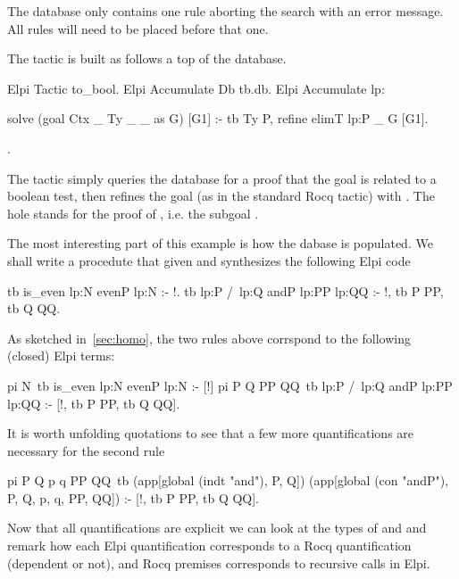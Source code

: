 \documentclass[a4paper, 11pt]{book}
\begin{document}
The database only contains one rule aborting the search with an error message.
All rules will need to be placed before that one.

The  tactic is built as follows a top of the
database.

\begin{rocqcode}
Elpi Tactic to_bool.
Elpi Accumulate Db tb.db.
Elpi Accumulate lp:{{

solve (goal Ctx _ Ty _ _ as G) [G1] :-
  tb Ty P,
  refine {{ elimT lp:P _ }} G [G1].

}}.
\end{rocqcode}

The tactic simply queries the database for a proof  that
the goal is related to a boolean test, then refines the goal (as in the
standard Rocq  tactic) with .
The hole stands for the proof of , i.e. the subgoal
.

The most interesting part of this example is how the dabase is populated.
We shall write a  procedute that given 
and  synthesizes the following Elpi code

\begin{elpicode}
tb {{ is_even lp:N }} {{ evenP lp:N }} :- !.
tb {{ lp:P /\ lp:Q }} {{ andP lp:PP lp:QQ }} :- !, tb P PP, tb Q QQ.
\end{elpicode}

As sketched in~\cref{sec:homo}, the two rules above corrspond to the
following (closed) Elpi terms:

\begin{elpicode}
pi N\ tb {{ is_even lp:N }} {{ evenP lp:N }} :- [!]
pi P Q PP QQ\ tb {{ lp:P /\ lp:Q }} {{ andP lp:PP lp:QQ }} :-
  [!, tb P PP, tb Q QQ].
\end{elpicode}

It is worth unfolding quotations to see that a few more quantifications are
necessary for the second rule

\begin{elpicode}
pi P Q p q PP QQ\
  tb (app[global (indt "and"), P, Q])
     (app[global (con "andP"), P, Q, p, q, PP, QQ]) :-
  [!, tb P PP, tb Q QQ].
\end{elpicode}
  

Now that all quantifications are explicit we can look at the types of
\rocq{evenP} and \rocq{andP} and remark how each \elpi{pi}
Elpi quantification corresponds to a Rocq quantification (dependent or not),
and Rocq premises corresponds to recursive calls in Elpi.
\end{document}
